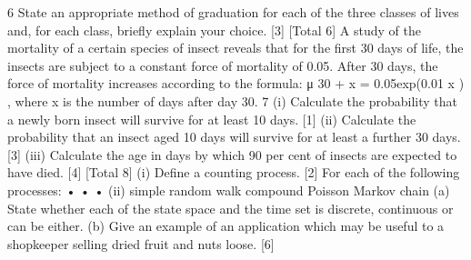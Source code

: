 \documentclass[a4paper,12pt]{article}
\begin{document}
\begin{enumerate}
6
State an appropriate method of graduation for each of the three classes of lives
and, for each class, briefly explain your choice.
[3]
[Total 6]
A study of the mortality of a certain species of insect reveals that for the first 30 days
of life, the insects are subject to a constant force of mortality of 0.05. After 30 days,
the force of mortality increases according to the formula:
μ 30 + x = 0.05exp(0.01 x ) ,
where x is the number of days after day 30.
7
(i) Calculate the probability that a newly born insect will survive for at least 10
days.
[1]
(ii) Calculate the probability that an insect aged 10 days will survive for at least a
further 30 days.
[3]
(iii) Calculate the age in days by which 90 per cent of insects are expected to have
died.
[4]
[Total 8]
(i) Define a counting process.
[2]
For each of the following processes:
•
•
•
(ii)
simple random walk
compound Poisson
Markov chain
(a) State whether each of the state space and the time set is discrete,
continuous or can be either.
(b) Give an example of an application which may be useful to a
shopkeeper selling dried fruit and nuts loose.
[6]



\end{enumerate}
\end{document}
